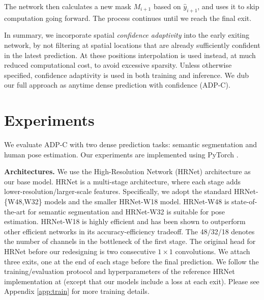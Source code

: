 \documentclass{article} %
\renewcommand{\cite}{\citep}
\begin{document}
The network then calculates a new mask $M_{i+1}$ based on $\hat{y}_{i+1}$, and uses it to skip computation going forward.
The process continues until we reach the final exit.

In summary, we incorporate spatial \emph{confidence adaptivity} into the early exiting network, by not filtering at spatial locations that are already sufficiently confident in the latest prediction.
At these positions interpolation is used instead, at much reduced computational cost, to avoid excessive sparsity.
Unless otherwise specified, confidence adaptivity is used in both training and inference. We dub our full approach as anytime dense prediction with confidence (ADP-C).

\section{Experiments}
We evaluate ADP-C with two dense prediction tasks: semantic segmentation and human pose estimation.
Our experiments are implemented using PyTorch \cite{paszke2019pytorch}. 


\vspace{1ex}
\noindent\textbf{Architectures.}
We use the High-Resolution Network (HRNet) \cite{wang2020deep} architecture as our base model. HRNet is a multi-stage architecture, where each stage adds lower-resolution/larger-scale features.
Specifically, we adopt the standard HRNet-\{W48,W32\} models and the smaller HRNet-W18 model.
HRNet-W48 is state-of-the-art for semantic segmentation and HRNet-W32 is suitable for pose estimation.
HRNet-W18 is highly efficient and has been shown to outperform other efficient networks \cite{zhao2018icnet,sandler2018mobilenetv2} in its accuracy-efficiency tradeoff. 
The 48/32/18 denotes the number of channels in the bottleneck of the first stage. The original head for HRNet before our redesigning is two consecutive $1\times1$ convolutions.
We attach three exits, 
one at the end of each stage before the final prediction.
We follow the training/evaluation protocol and hyperparameters of the reference HRNet implementation at \cite{sun2019deep,wang2020deep} (except that our models include a loss at each exit).
Please see Appendix \ref{app:train} for more training details.
\end{document}
